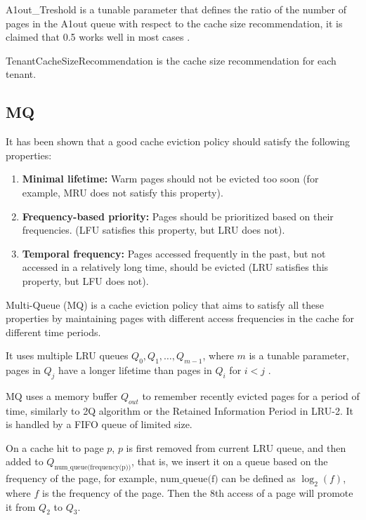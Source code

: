 A1out\_Treshold is a tunable parameter that defines the ratio of the number of pages in the A1out
queue with respect to the cache size recommendation, it is claimed that 0.5 works well in most
cases \cite{2q-article}.

TenantCacheSizeRecommendation is the cache size recommendation for each tenant.

\subsection{MQ}

It has been shown that a good cache eviction policy should satisfy the following properties:

\begin{enumerate}
    \item \textbf{Minimal lifetime:} Warm pages should not be evicted too soon (for 
    example, MRU does not satisfy this property).
    \item \textbf{Frequency-based priority:} Pages should be prioritized based on their 
    frequencies. (LFU satisfies this property, but LRU does not).
    \item \textbf{Temporal frequency:} Pages accessed frequently in the past, but not 
    accessed in a relatively long time, should be evicted (LRU satisfies this property, 
    but LFU does not).
\end{enumerate}

Multi-Queue (MQ) is a cache eviction policy that aims to satisfy all these properties \cite{mq-article}
by maintaining pages with different access frequencies in the cache for different time periods.

It uses multiple LRU queues $Q_0, Q_1, \ldots, Q_{m-1}$, where $m$ is a tunable parameter, pages in $Q_j$
have a longer lifetime than pages in $Q_{i}$ for $i < j$ \cite{mq-article}.

MQ uses a memory buffer $Q_{out}$ to remember recently evicted pages for a period of time, similarly to
2Q algorithm \cite{2q-article} or the Retained Information Period in LRU-2. It is handled by a 
FIFO queue of limited size.

On a cache hit to page $p$, $p$ is first removed from current LRU queue, and then added to 
$Q_{\text{num\_queue(frequency(p))}}$, that is, we insert it on a queue based on the frequency of the page,
for example, $\text{num\_queue(f)}$ can be defined as $\log_2(f)$, where $f$ is the frequency of the page.
Then the $8$th access of a page will promote it from $Q_2$ to $Q_3$.

